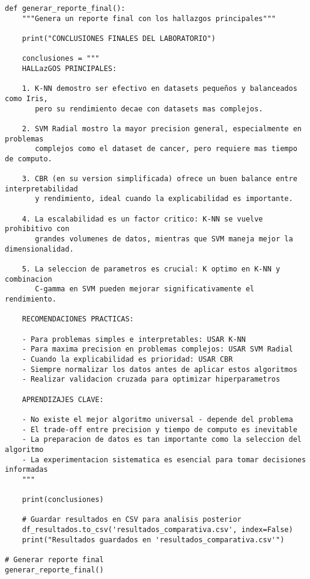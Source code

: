 \documentclass[12pt]{article}
\begin{document}
\begin{lstlisting}
def generar_reporte_final():
    """Genera un reporte final con los hallazgos principales"""
    
    print("CONCLUSIONES FINALES DEL LABORATORIO")
    
    conclusiones = """
    HALLazGOS PRINCIPALES:
    
    1. K-NN demostro ser efectivo en datasets pequeños y balanceados como Iris, 
       pero su rendimiento decae con datasets mas complejos.
    
    2. SVM Radial mostro la mayor precision general, especialmente en problemas 
       complejos como el dataset de cancer, pero requiere mas tiempo de computo.
    
    3. CBR (en su version simplificada) ofrece un buen balance entre interpretabilidad 
       y rendimiento, ideal cuando la explicabilidad es importante.
    
    4. La escalabilidad es un factor critico: K-NN se vuelve prohibitivo con 
       grandes volumenes de datos, mientras que SVM maneja mejor la dimensionalidad.
    
    5. La seleccion de parametros es crucial: K optimo en K-NN y combinacion 
       C-gamma en SVM pueden mejorar significativamente el rendimiento.
    
    RECOMENDACIONES PRACTICAS:
    
    - Para problemas simples e interpretables: USAR K-NN
    - Para maxima precision en problemas complejos: USAR SVM Radial  
    - Cuando la explicabilidad es prioridad: USAR CBR
    - Siempre normalizar los datos antes de aplicar estos algoritmos
    - Realizar validacion cruzada para optimizar hiperparametros
    
    APRENDIZAJES CLAVE:
    
    - No existe el mejor algoritmo universal - depende del problema
    - El trade-off entre precision y tiempo de computo es inevitable
    - La preparacion de datos es tan importante como la seleccion del algoritmo
    - La experimentacion sistematica es esencial para tomar decisiones informadas
    """
    
    print(conclusiones)
    
    # Guardar resultados en CSV para analisis posterior
    df_resultados.to_csv('resultados_comparativa.csv', index=False)
    print("Resultados guardados en 'resultados_comparativa.csv'")

# Generar reporte final
generar_reporte_final()
\end{lstlisting}
\end{document}
